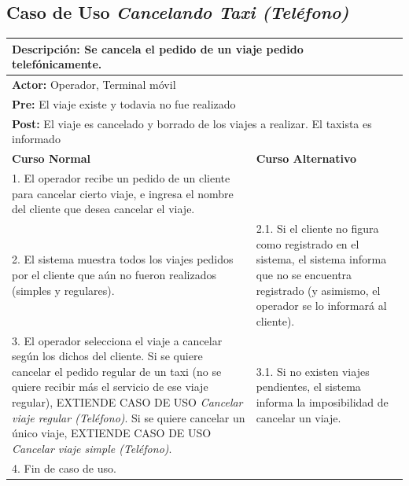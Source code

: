 \documentclass[a4paper]{article}
\begin{document}
\subsection{Caso de Uso \textit{Cancelando Taxi (Tel\'efono)}}
\begin{center}
\begin{tabular}{|p{10cm} | p{6cm}|}
\hline
\multicolumn{2}{|p{15cm}|}{\textbf{Descripci\'on:} Se cancela el pedido de un viaje pedido telef\'onicamente.} \\
\hline
\multicolumn{2}{|p{15cm}|}{\textbf{Actor:} Operador, Terminal m\'ovil} \\
\hline
\multicolumn{2}{|p{15cm}|}{\textbf{Pre:} El viaje existe y todavia no fue realizado} \\
\hline
\multicolumn{2}{|p{15cm}|}{\textbf{Post:} El viaje es cancelado y borrado de los viajes a realizar. El taxista es informado}\\
\hline
\textbf{Curso Normal}  & \textbf{Curso Alternativo} \\ \hline
1. El operador recibe un pedido de un cliente para cancelar cierto viaje, e ingresa el nombre del cliente que desea cancelar el viaje. & \\ \hline
2. El sistema muestra todos los viajes pedidos por el cliente que a\'un no fueron realizados (simples y regulares). & 2.1. Si el cliente no figura como registrado en el sistema, el sistema informa que no se encuentra registrado (y asimismo, el operador se lo informar\'a al cliente). \\ \hline
3. El operador selecciona el viaje a cancelar seg\'un los dichos del cliente. Si se quiere cancelar el pedido regular de un taxi (no se quiere recibir m\'as el servicio de ese viaje regular), EXTIENDE CASO DE USO \textit{Cancelar viaje regular (Tel\'efono)}. \newline Si se quiere cancelar un \'unico viaje, EXTIENDE CASO DE USO \textit{Cancelar viaje simple (Tel\'efono)}. & 3.1. Si no existen viajes pendientes, el sistema informa la imposibilidad de cancelar un viaje. \\ \hline %
4. Fin de caso de uso. & \\ \hline
\end{tabular}
\end{center}
\end{document}
